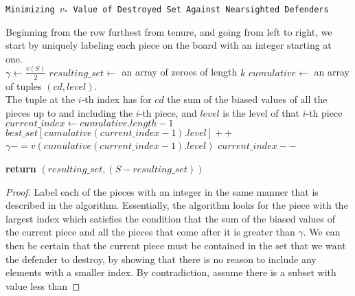 \documentclass{article}
\theoremstyle{plain}
\theoremstyle{definition}
\theoremstyle{remark}
\begin{document}
\begin{center}
  \begin{minipage}{1\linewidth} %
    \begin{algorithm}[H]

      \caption{\texttt{Minimizing $v_{*}$ Value of Destroyed Set Against Nearsighted Defenders}} %
      \label{alg:farsighted}   %

  \medskip
	Beginning from the row furthest from tenure, and going from left to right, we start by uniquely labeling each piece on the board with an integer starting at one.\\
      \medskip
      $\gamma \leftarrow \frac{v(S)}{2}$\;
      $resulting\_set \leftarrow$ an array of zeroes of length $k$\;
      $cumulative \leftarrow$ an array of tuples $(cd, level)$. \\ The tuple at the $i$-th index has for $cd$ the sum of the biased values of all the pieces up to and including the $i$-th piece, and $level$ is the level of that $i$-th piece\;
      $current\_index \leftarrow cumulative.length - 1$\;
      \medskip
{} {
		 {
			$best\_set[cumulative(current\_index - 1).level]{+}{+}$\;
			$\gamma {-}{=} v(cumulative(current\_index - 1).level)$\;
		}
		$current\_index{-}{-}$\;
      }
    
     \medskip
      {\bf return} $(resulting\_set, (S - resulting\_set))$\;
    \end{algorithm}
  \end{minipage}
\end{center}

\begin{proof}
Label each of the pieces with an integer in the same manner that is described in the algorithm. Essentially, the algorithm looks for the piece with the largest index which satisfies the condition that the sum of the biased values of the current piece and all the pieces that come after it is greater than $\gamma$. We can then be certain that the current piece must be contained in the set that we want the defender to destroy, by showing that there is no reason to include any elements with a smaller index. By contradiction, assume there is a subset with value less than 
\end{proof}
\end{document}
